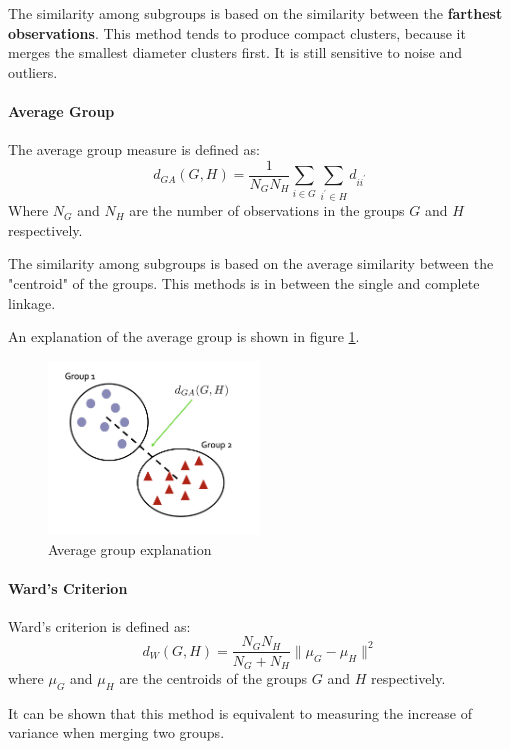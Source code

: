 The similarity among subgroups is based on the similarity between the \textbf{farthest observations}. This method tends to produce compact clusters, because it merges the smallest diameter clusters first. It is still sensitive to noise and outliers.

\paragraph*{Average Group}
The average group measure is defined as:
\[
    d_{GA}(G,H) = \frac{1}{N_G N_H} \sum_{i \in G} \sum_{i^{\prime} \in H} d_{ii^{\prime}}
\]
Where $N_G$ and $N_H$ are the number of observations in the groups $G$ and $H$ respectively.

The similarity among subgroups is based on the average similarity between the "centroid" of the groups. This methods is in between the single and complete linkage.

An explanation of the average group is shown in figure \ref{fig:averagegroup}.
\begin{figure}[h]
    \centering
    \includegraphics[width=0.5\textwidth]{./figures/chapter_7/averagegroup.png}
    \caption{Average group explanation}
    \label{fig:averagegroup}
\end{figure}

\paragraph*{Ward's Criterion}
Ward's criterion is defined as:
\[
    d_W(G,H) = \frac{N_G N_H}{N_G + N_H} \| \mu_G - \mu_H \|^2
\]
where $\mu_G$ and $\mu_H$ are the centroids of the groups $G$ and $H$ respectively.

It can be shown that this method is equivalent to measuring the increase of variance when merging two groups.

